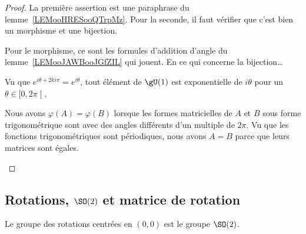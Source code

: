 \begin{proof}
    La première assertion est une paraphrase du lemme~\ref{LEMooHRESooQTrpMz}. Pour la seconde, il faut vérifier que c'est bien un morphisme et une bijection.

    Pour le morphisme, ce sont les formules d'addition d'angle du lemme~\ref{LEMooJAWBooJGfZIL} qui jouent. En ce qui concerne la bijection\ldots

    \begin{subproof}
        \item[Surjection]
            Vu que \(  e^{i\theta+2ki\pi}= e^{i\theta}\), tout élément de \( \gU(1)\) est exponentielle de \( i\theta\) pour un \( \theta\in\mathopen[ 0 , 2\pi \mathclose[\).
        \item[Injection]
            Nous avons \( \varphi(A)=\varphi(B)\) lorsque les formes matricielles de \( A\) et \( B\) sous forme trigonométrique sont avec des angles différents d'un multiple de \( 2\pi\). Vu que les fonctions trigonométriques sont périodiques, nous avons \( A=B\) parce que leurs matrices sont égales.
    \end{subproof}
\end{proof}

\subsection{Rotations, \( \SO(2)\) et matrice de rotation}

\begin{corollary} \label{CORooVYUJooDbkIFY}
    Le groupe des rotations centrées en \( (0,0)\) est le groupe \( \SO(2)\).
\end{corollary}

